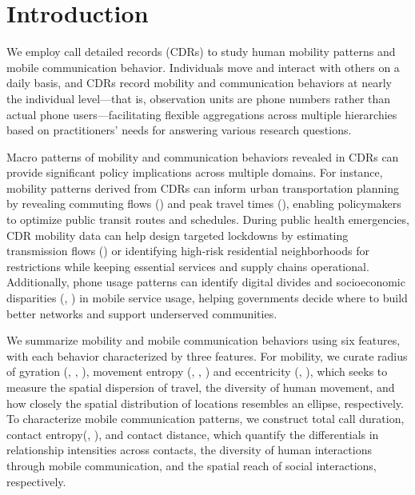 \chapter{Introduction}
We employ call detailed records (CDRs) to study human mobility patterns and mobile communication behavior.
Individuals move and interact with others on a daily basis, and CDRs record mobility and communication behaviors at nearly the individual level---that is, observation units are phone numbers rather than actual phone users---facilitating flexible aggregations across multiple hierarchies based on practitioners' needs for answering various research questions.

Macro patterns of mobility and communication behaviors revealed in CDRs can provide significant policy implications across multiple domains.
For instance, mobility patterns derived from CDRs can inform urban transportation planning by revealing commuting flows (\cite{phithakkitnukoon2012socio}) and peak travel times (\cite{tongsinoot2017exploring}), enabling policymakers to optimize public transit routes and schedules.
During public health emergencies, CDR mobility data can help design targeted lockdowns by estimating transmission flows (\cite{wesolowski2016connecting}) or identifying high-risk  residential neighborhoods for restrictions while keeping essential services and supply chains operational.
Additionally, phone usage patterns can identify digital divides and socioeconomic disparities (\cite{onnela2007structure}, \cite{blumenstock2015predicting}) in mobile service usage, helping governments decide where to build better networks and support underserved communities.

We summarize mobility and mobile communication behaviors using six features, with each behavior characterized by three features.
For mobility, we curate radius of gyration (\cite{gonzalez2008understanding}, \cite{ranjan2012call}, \cite{pappalardo2015returners}), movement entropy (\cite{eagle2010network}, \cite{song2010limits}, \cite{pappalardo2016analytical}) and eccentricity (\cite{yuan2012correlating}, \cite{zhao2019effect}), which seeks to measure the spatial dispersion of travel, the diversity of human movement, and how closely the spatial distribution of locations resembles an ellipse, respectively.
To characterize mobile communication patterns, we construct total call duration, contact entropy(\cite{eagle2010network}, \cite{pappalardo2016analytical}), and contact distance, which quantify the differentials in relationship intensities across contacts, the diversity of human interactions through mobile communication, and the spatial reach of social interactions, respectively.

